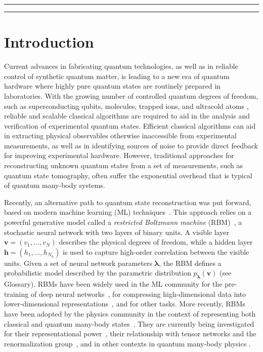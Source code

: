 \documentclass[submission, Phys, hidelnks]{SciPost}
\begin{document}
\vspace{10pt}
\noindent\rule{\textwidth}{1pt}
\tableofcontents\thispagestyle{fancy}
\noindent\rule{\textwidth}{1pt}
\vspace{10pt}

\section{Introduction}
Current advances in fabricating quantum technologies, as well as in reliable control of synthetic quantum matter, is leading to a new era of quantum 
hardware where highly pure quantum states are routinely prepared in laboratories. 
With the growing number of controlled quantum degrees of freedom, such as superconducting qubits, molecules, trapped ions, and ultracold atoms \cite{gambetta17,gambetta18,Bernien17}, reliable and scalable classical algorithms are required to aid in the analysis and verification of experimental quantum states. 
Efficient classical algorithms can aid in extracting physical observables otherwise inaccessible from experimental measurements, as well as in identifying 
sources of noise to provide direct feedback for improving experimental hardware. However, traditional approaches for reconstructing unknown quantum states from a set of measurements, such as quantum state tomography, often suffer the exponential overhead that is typical of quantum many-body systems.

Recently, an alternative path to quantum state reconstruction was put forward, based on modern machine learning (ML) techniques~\cite{torlai2018tomography, TorlaiMixed}. This approach relies on a powerful generative model called a {\it restricted Boltzmann machine} (RBM)~\cite{Smolensky}, a stochastic neural network with two layers of binary units. A visible layer $\bm{v}=(v_1,\dots,v_N)$ describes the physical degrees of freedom, while a hidden layer $\bm{h}=(h_1,\dots,h_{N_h})$ is used to capture high-order correlation between the visible units. Given a set of neural network parameters $\bm{\lambda}$, the RBM defines a probabilistic model described by the parametric distribution $p_{\bm{\lambda}}(\bm{v})$ (see Glossary). RBMs have been widely used in the ML community for the pre-training of deep neural networks~\cite{Hinton06}, for compressing high-dimensional data into lower-dimensional representations~\cite{Hinton504}, and for other tasks. More recently, RBMs have been adopted by the physics community in the context of representing both classical and quantum many-body states~\cite{Torlai2016thermo, CarleoTroyer2017Science}.  They are currently being investigated for their representational power~\cite{Gao}, their relationship with tensor networks and the renormalization group~\cite{GlasserCirac2018,Maciej,ChenWang2018}, and in other contexts in quantum many-body physics \cite{PhysRevB.96.205152}.
\end{document}
